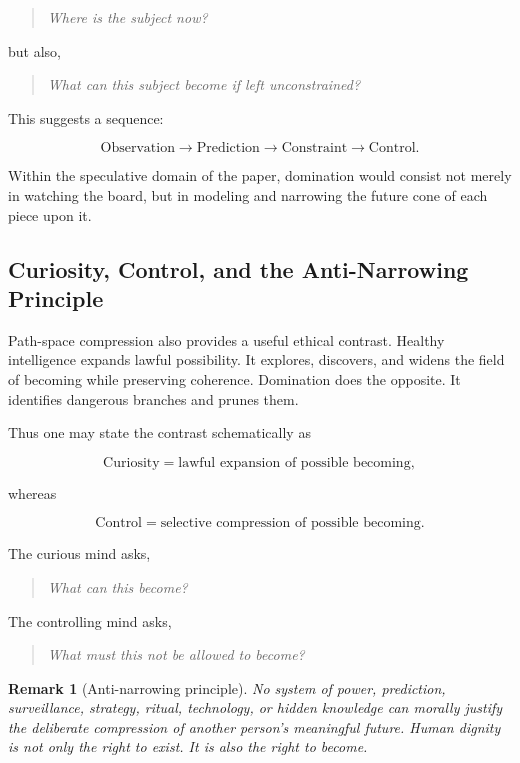 \documentclass[12pt]{article}
\newtheorem{remark}{Remark}
\begin{document}
\begin{quote}
\textit{Where is the subject now?}
\end{quote}

but also,

\begin{quote}
\textit{What can this subject become if left unconstrained?}
\end{quote}

This suggests a sequence:

\[
\text{Observation} \longrightarrow \text{Prediction} \longrightarrow \text{Constraint} \longrightarrow \text{Control}.
\]

Within the speculative domain of the paper, domination would consist not merely in watching the board, but in modeling and narrowing the future cone of each piece upon it.

\subsection{Curiosity, Control, and the Anti-Narrowing Principle}

Path-space compression also provides a useful ethical contrast. Healthy intelligence expands lawful possibility. It explores, discovers, and widens the field of becoming while preserving coherence. Domination does the opposite. It identifies dangerous branches and prunes them.

Thus one may state the contrast schematically as

\[
\text{Curiosity} = \text{lawful expansion of possible becoming},
\]

whereas

\[
\text{Control} = \text{selective compression of possible becoming}.
\]

The curious mind asks,

\begin{quote}
\textit{What can this become?}
\end{quote}

The controlling mind asks,

\begin{quote}
\textit{What must this not be allowed to become?}
\end{quote}

\begin{remark}[Anti-narrowing principle]
No system of power, prediction, surveillance, strategy, ritual, technology, or hidden knowledge can morally justify the deliberate compression of another person's meaningful future. Human dignity is not only the right to exist. It is also the right to become.
\end{remark}
\end{document}
